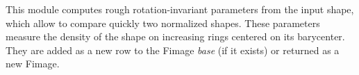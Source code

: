 This module computes rough rotation-invariant parameters from the input shape,
which allow to compare quickly two normalized shapes.
These parameters measure the density of the shape on increasing rings centered
on its barycenter. They are added as a new row to the Fimage 
{\it base} (if it exists) or returned as a new Fimage.
